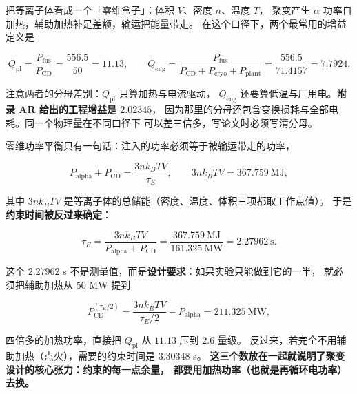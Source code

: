 把等离子体看成一个「零维盒子」：体积 $V$、密度 $n$、温度 $T$，
聚变产生 $\alpha$ 功率自加热，辅助加热补足差额，输运把能量带走。
在这个口径下，两个最常用的增益定义是

\begin{equation}
Q_\mathrm{pl}=\frac{P_\mathrm{fus}}{P_\mathrm{CD}}
=\frac{556.5}{50}=11.13,
\qquad
Q_\mathrm{eng}=\frac{P_\mathrm{fus}}{P_\mathrm{CD}+P_\mathrm{cryo}+P_\mathrm{plant}}
=\frac{556.5}{71.4157}=7.7924.
\label{eq:app-az-q}
\end{equation}

注意两者的分母差别：$Q_\mathrm{pl}$ 只算加热与电流驱动，
$Q_\mathrm{eng}$ 还要算低温与厂用电。\textbf{附录 AR 给出的工程增益是 $2.02345$}，
因为那里的分母还包含变换损耗与全部电耗。同一个物理量在不同口径下
可以差三倍多，写论文时必须写清分母。

零维功率平衡只有一句话：注入的功率必须等于被输运带走的功率，

\begin{equation}
P_\mathrm{alpha}+P_\mathrm{CD}
=\frac{3nk_BTV}{\tau_E},
\qquad
3nk_BTV=367.759\ \mathrm{MJ},
\label{eq:app-az-balance}
\end{equation}

其中 $3nk_BTV$ 是等离子体的总储能（密度、温度、体积三项都取工作点值）。
于是\textbf{约束时间被反过来确定}：

\begin{equation}
\tau_E=\frac{3nk_BTV}{P_\mathrm{alpha}+P_\mathrm{CD}}
=\frac{367.759\ \mathrm{MJ}}{161.325\ \mathrm{MW}}=2.27962\ \mathrm{s}.
\label{eq:app-az-taue}
\end{equation}

这个 $2.27962$ s 不是测量值，而是\textbf{设计要求}：如果实验只能做到它的一半，
就必须把辅助加热从 $50$ MW 提到

\begin{equation}
P_\mathrm{CD}^{(\tau_E/2)}=\frac{3nk_BTV}{\tau_E/2}-P_\mathrm{alpha}=211.325\ \mathrm{MW},
\label{eq:app-az-half}
\end{equation}

四倍多的加热功率，直接把 $Q_\mathrm{pl}$ 从 $11.13$ 压到 $2.6$ 量级。
反过来，若完全不用辅助加热（点火），需要的约束时间是 $3.30348$ s。
\textbf{这三个数放在一起就说明了聚变设计的核心张力：约束的每一点余量，
都要用加热功率（也就是再循环电功率）去换。}

